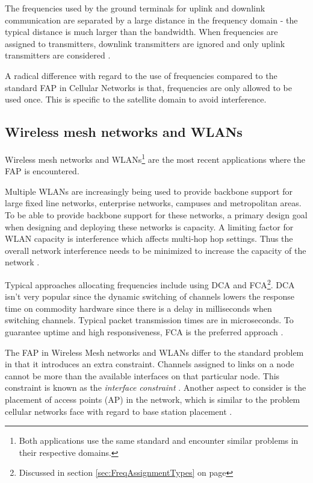 The frequencies used by the ground terminals for uplink and downlink communication are separated by a large distance in the frequency domain - the typical distance is much larger than the bandwidth. When frequencies are assigned to transmitters, downlink transmitters are ignored and only uplink transmitters are considered \cite{Karen2004}. 

A radical difference with regard to the use of frequencies compared to the standard FAP in Cellular Networks is that, frequencies are only allowed to be used once. This is specific to the satellite domain to avoid interference\cite{Karen2004}.

\subsection{Wireless mesh networks and WLANs}
Wireless mesh networks and WLANs\footnote{Both applications use the same standard and encounter similar problems in their respective domains.} are the most recent applications where the FAP is encountered. 

Multiple WLANs are increasingly being used to provide backbone support for large fixed line networks, enterprise networks, campuses and metropolitan areas. To be able to provide backbone support for these networks, a primary design goal when designing and deploying these networks is capacity. A limiting factor for WLAN capacity is interference which affects multi-hop hop settings. Thus the overall network interference needs to be minimized to increase the capacity of the network \cite{MultiradioMeshNetworks}. 

Typical approaches allocating frequencies include using DCA and FCA\footnote{Discussed in section \ref{sec:FreqAssignmentTypes} on page \pageref{sec:FreqAssignmentTypes}}. DCA isn't very popular since the dynamic switching of channels lowers the response time on commodity hardware since there is a delay in milliseconds when switching channels. Typical packet transmission times are in microseconds. To guarantee uptime and high responsiveness, FCA is the preferred approach \cite{MultiradioMeshNetworks}.

The FAP in Wireless Mesh networks and WLANs differ to the standard problem in that it introduces an extra constraint. Channels assigned to links on a node cannot be more than the available interfaces on that particular node. This constraint is known as the \emph{interface constraint} \cite{MultiradioMeshNetworks}. Another aspect to consider is the placement of access points (AP) in the network, which is similar to the problem cellular networks face with regard to base station placement \cite{Karen2004}.

